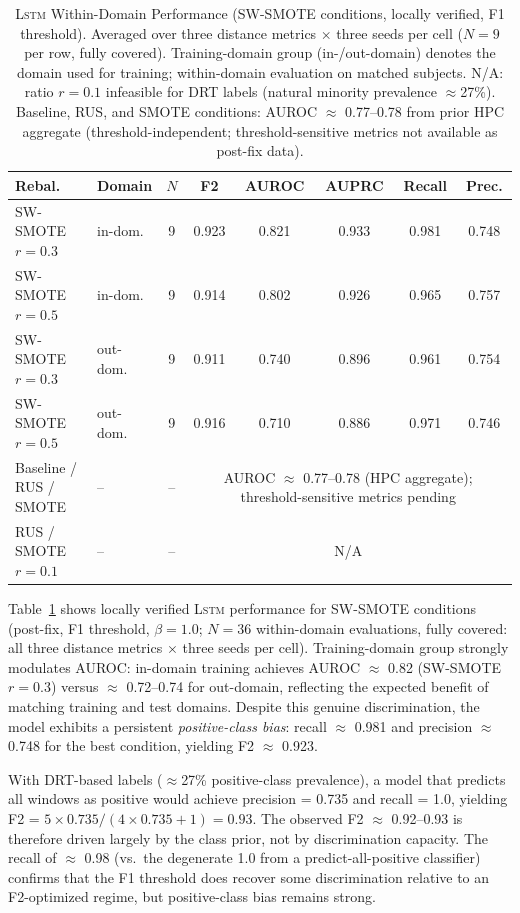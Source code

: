 \documentclass[lettersize,journal]{IEEEtran}
\newcommand{\Impl}[1]{\textsc{#1}}
\begin{document}
\begin{table}[!t]
\caption{\Impl{Lstm} Within-Domain Performance (SW-SMOTE conditions, locally verified, F1 threshold). Averaged over three distance metrics $\times$ three seeds per cell ($N{=}9$ per row, fully covered). Training-domain group (in-/out-domain) denotes the domain used for training; within-domain evaluation on matched subjects. N/A: ratio $r{=}0.1$ infeasible for DRT labels (natural minority prevalence $\approx$27\%). Baseline, RUS, and SMOTE conditions: AUROC $\approx$ 0.77--0.78 from prior HPC aggregate (threshold-independent; threshold-sensitive metrics not available as post-fix data).\label{tab:lstm_results}}
\centering
\footnotesize
\begin{tabular}{|l|l|c|c|c|c|c|c|}
\hline
Rebal. & Domain & $N$ & F2 & AUROC & AUPRC & Recall & Prec. \\
\hline
SW-SMOTE $r\!=\!0.3$ & in-dom. & 9 & 0.923 & 0.821 & 0.933 & 0.981 & 0.748 \\
SW-SMOTE $r\!=\!0.5$ & in-dom. & 9 & 0.914 & 0.802 & 0.926 & 0.965 & 0.757 \\
\hline
SW-SMOTE $r\!=\!0.3$ & out-dom. & 9 & 0.911 & 0.740 & 0.896 & 0.961 & 0.754 \\
SW-SMOTE $r\!=\!0.5$ & out-dom. & 9 & 0.916 & 0.710 & 0.886 & 0.971 & 0.746 \\
\hline
Baseline / RUS / SMOTE & -- & -- & \multicolumn{5}{c|}{AUROC $\approx$ 0.77--0.78 (HPC aggregate); threshold-sensitive metrics pending} \\
RUS / SMOTE $r\!=\!0.1$ & -- & -- & \multicolumn{5}{c|}{N/A} \\
\hline
\end{tabular}
\end{table}

Table~\ref{tab:lstm_results} shows locally verified \Impl{Lstm} performance for SW-SMOTE conditions (post-fix, F1 threshold, $\beta{=}1.0$; $N{=}36$ within-domain evaluations, fully covered: all three distance metrics $\times$ three seeds per cell).
Training-domain group strongly modulates AUROC: in-domain training achieves AUROC $\approx$ 0.82 (SW-SMOTE $r{=}0.3$) versus $\approx$ 0.72--0.74 for out-domain, reflecting the expected benefit of matching training and test domains.
Despite this genuine discrimination, the model exhibits a persistent \emph{positive-class bias}: recall $\approx$ 0.981 and precision $\approx$ 0.748 for the best condition, yielding F2 $\approx$ 0.923.

With DRT-based labels ($\approx$27\% positive-class prevalence), a model that predicts all windows as positive would achieve precision = 0.735 and recall = 1.0, yielding F2 = $5 \times 0.735/(4 \times 0.735 + 1) = 0.93$.
The observed F2 $\approx$ 0.92--0.93 is therefore driven largely by the class prior, not by discrimination capacity.
The recall of $\approx$ 0.98 (vs.\ the degenerate 1.0 from a predict-all-positive classifier) confirms that the F1 threshold does recover some discrimination relative to an F2-optimized regime, but positive-class bias remains strong.
\end{document}
